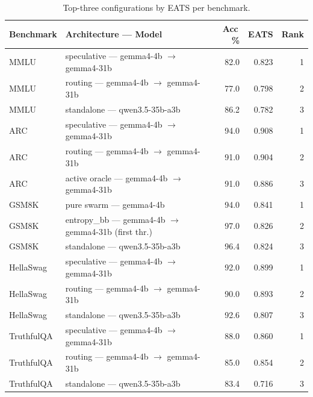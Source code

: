 \begin{table}[htbp]
\centering
\caption{Top-three configurations by EATS per benchmark.}
\label{tab:eats-leaders}
\small
\renewcommand{\arraystretch}{1.2}
\begin{tabularx}{\linewidth}{@{} l X r r r @{}}
\toprule
\textbf{Benchmark} & \textbf{Architecture --- Model} & \textbf{Acc\,\%} & \textbf{EATS} & \textbf{Rank} \\
\midrule
MMLU & speculative --- gemma4-4b $\rightarrow$ gemma4-31b & 82.0 & 0.823 & 1 \\
MMLU & routing --- gemma4-4b $\rightarrow$ gemma4-31b & 77.0 & 0.798 & 2 \\
MMLU & standalone --- qwen3.5-35b-a3b & 86.2 & 0.782 & 3 \\
\midrule
ARC & speculative --- gemma4-4b $\rightarrow$ gemma4-31b & 94.0 & 0.908 & 1 \\
ARC & routing --- gemma4-4b $\rightarrow$ gemma4-31b & 91.0 & 0.904 & 2 \\
ARC & active oracle --- gemma4-4b $\rightarrow$ gemma4-31b & 91.0 & 0.886 & 3 \\
\midrule
GSM8K & pure swarm --- gemma4-4b & 94.0 & 0.841 & 1 \\
GSM8K & entropy\_bb --- gemma4-4b $\rightarrow$ gemma4-31b (first thr.) & 97.0 & 0.826 & 2 \\
GSM8K & standalone --- qwen3.5-35b-a3b & 96.4 & 0.824 & 3 \\
\midrule
HellaSwag & speculative --- gemma4-4b $\rightarrow$ gemma4-31b & 92.0 & 0.899 & 1 \\
HellaSwag & routing --- gemma4-4b $\rightarrow$ gemma4-31b & 90.0 & 0.893 & 2 \\
HellaSwag & standalone --- qwen3.5-35b-a3b & 92.6 & 0.807 & 3 \\
\midrule
TruthfulQA & speculative --- gemma4-4b $\rightarrow$ gemma4-31b & 88.0 & 0.860 & 1 \\
TruthfulQA & routing --- gemma4-4b $\rightarrow$ gemma4-31b & 85.0 & 0.854 & 2 \\
TruthfulQA & standalone --- qwen3.5-35b-a3b & 83.4 & 0.716 & 3 \\
\bottomrule
\end{tabularx}
\end{table}

